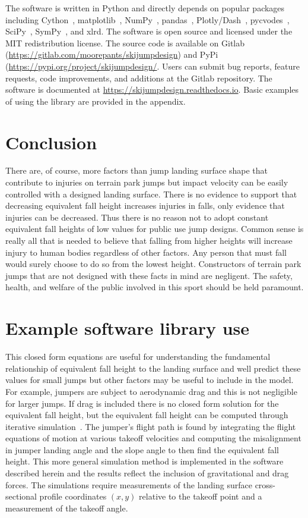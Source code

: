 \documentclass{article}
\begin{document}
The software is written in Python and directly depends on popular packages
including Cython~\cite{Behnel2011}, matplotlib~\cite{Hunter2007},
NumPy~\cite{Oliphant2006}, pandas~\cite{McKinney2020},
Plotly/Dash~\cite{Plotly2015}, pycvodes~\cite{Dahlgren2018},
SciPy~\cite{Virtanen2020}, SymPy~\cite{Meurer2017}, and xlrd.  The software is
open source and licensed under the MIT redistribution license.  The source code
is available on Gitlab (\url{https://gitlab.com/moorepants/skijumpdesign}) and
PyPi (\url{https://pypi.org/project/skijumpdesign/}. Users can submit bug
reports, feature requests, code improvements, and additions at the Gitlab
repository. The software is documented at
\url{https://skijumpdesign.readthedocs.io}. Basic examples of using the library
are provided in the appendix.

\section{Conclusion}
%
There are, of course, more factors than jump landing surface shape that
contribute to injuries on terrain park jumps but impact velocity can be easily
controlled with a designed landing surface. There is no evidence to support
that decreasing equivalent fall height increases injuries in falls, only
evidence that injuries can be decreased. Thus there is no reason not to adopt
constant equivalent fall heights of low values for public use jump designs.
Common sense is really all that is needed to believe that falling from higher
heights will increase injury to human bodies regardless of other factors. Any
person that must fall would surely choose to do so from the lowest height.
Constructors of terrain park jumps that are not designed with these facts in
mind are negligent. The safety, health, and welfare of the public involved in
this sport should be held paramount.




\appendix

\section{Example software library use}
%
This closed form equations are useful for understanding the fundamental
relationship of equivalent fall height to the landing surface and well predict
these values for small jumps but other factors may be useful to include in the
model. For example, jumpers are subject to aerodynamic drag and this is not
negligible for larger jumps. If drag is included there is no closed form
solution for the equivalent fall height, but the equivalent fall height can be
computed through iterative simulation~\cite{Levy2015}. The jumper's flight path
is found by integrating the flight equations of motion at various takeoff
velocities and computing the misalignment in jumper landing angle and the slope
angle to then find the equivalent fall height. This more general simulation
method is implemented in the software described herein and the results reflect
the inclusion of gravitational and drag forces. The simulations require
measurements of the landing surface cross-sectional profile coordinates $(x,y)$
relative to the takeoff point and a measurement of the takeoff angle.
\end{document}
